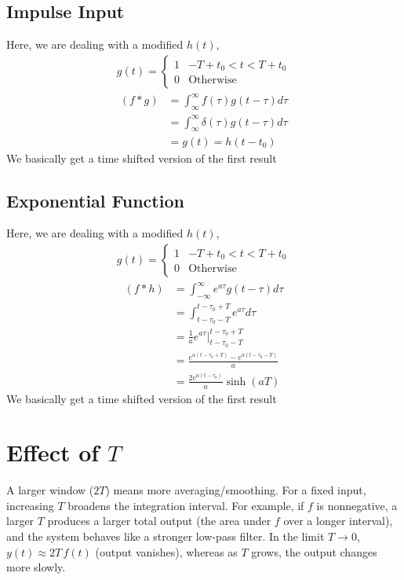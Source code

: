 \documentclass[12pt,a4paper]{report}
\newcommand{\brak}[1]{\ensuremath{\left(#1\right)}}
\providecommand{\brak}[1]{\ensuremath{\left(#1\right)}}
\begin{document}
\section{Impulse Input}
Here, we are dealing with a modified $h\brak{t}$,
\begin{align*}
    g\brak{t} = \begin{cases}
        1 & -T + t_0 < t < T + t_0\\
        0 & \text{Otherwise}
    \end{cases}
\end{align*}
\begin{align*}
    \brak{f\ast g} &= \int_{\infty}^{\infty} f\brak{\tau} g\brak{t-\tau}d\tau\\
    &= \int_{\infty}^{\infty} \delta\brak{\tau} g\brak{t-\tau}d\tau\\ 
    &= g\brak{t} = h\brak{t - t_0}
\end{align*}
We basically get a time shifted version of the first result

\section{Exponential Function}
Here, we are dealing with a modified $h\brak{t}$,
\begin{align*}
    g\brak{t} = \begin{cases}
        1 & -T + t_0 < t < T + t_0\\
        0 & \text{Otherwise}
    \end{cases}
\end{align*}
\begin{align*}
\brak{f \ast h} &= \int_{-\infty}^{\infty} e^{a\tau} g(t - \tau) d\tau \\
&= \int_{t-\tau_0-T}^{t-\tau_0+T} e^{a\tau} d\tau \\
&= \frac{1}{a} e^{a\tau} \Big|_{t-\tau_0-T}^{t-\tau_0+T} \\
&= \frac{e^{a(t-\tau_0+T)} - e^{a(t-\tau_0-T)}}{a} \\
&= \frac{2e^{a(t-\tau_0)}}{a} \sinh(aT)
\end{align*}
We basically get a time shifted version of the first result
\chapter{Effect of $T$}
A larger window ($2T$) means more averaging/smoothing. For a fixed input, increasing $T$ broadens the integration interval. For example, if $f$ is nonnegative, a larger $T$ produces a larger total output (the area under $f$ over a longer interval), and the system behaves like a stronger low-pass filter. In the limit $T \to 0$, $y(t) \approx 2T\, f(t)$ (output vanishes), whereas as $T$ grows, the output changes more slowly.
\end{document}
